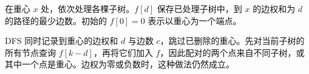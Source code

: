 在重心 $x$ 处，依次处理各棵子树。$f[d]$ 保存已处理子树中，到 $x$ 的边权和为 $d$ 的路径的最少边数。初始的 $f[0]=0$ 表示以重心为一个端点。

DFS 同时记录到重心的边权和 $d$ 与边数 $c$，跳过已删除的重心。先对当前子树的所有节点查询 $f[k-d]$，再将它们加入 $f$，因此配对的两个点来自不同子树，或其中一个点是重心。边权为零或负数时，这种做法仍然成立。
